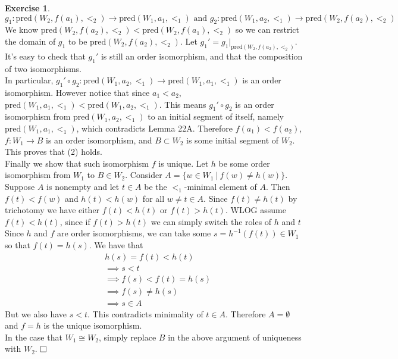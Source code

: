 \documentclass{article}
\theoremstyle{definition}
\newtheorem{exercise}{Exercise}[section]
\newcommand{\es}{$\hfill \square$}
\begin{document}
\begin{exercise}
        $$g_1: \text{pred}(W_2, f(a_1), <_2) \rightarrow \text{pred}(W_1, a_1, <_1) \text{ and } g_2: \text{pred}(W_1, a_2, <_1) \rightarrow \text{pred}(W_2, f(a_2), <_2)$$
        We know $\text{pred}(W_2, f(a_2), <_2)  < \text{pred}(W_2, f(a_1), <_2)$ so we can restrict the domain of $g_1$ to be $\text{pred}(W_2, f(a_2), <_2)$. Let $g_1' = g_1 |_{\text{pred}(W_2, f(a_2), <_2)}$. It's easy to check that $g_1'$ is still an order isomorphism, and that the composition of two isomorphisms.\\
        In particular, $g_1' \circ g_2: \text{pred}(W_1, a_2, <_1) \rightarrow \text{pred}(W_1, a_1, <_1)$ is an order isomorphism. However notice that since $a_1 < a_2$, $\text{pred}(W_1, a_1, <_1) < \text{pred}(W_1, a_2, <_1)$. This means $g_1' \circ g_2$ is an order isomorphism from $\text{pred}(W_1, a_2, <_1)$ to an initial segment of itself, namely $\text{pred}(W_1, a_1, <_1)$, which contradicts Lemma 22A. Therefore $f(a_1) < f(a_2)$, $f: W_1 \rightarrow B$ is an order isomorphism, and $B \subset W_2$ is some initial segment of $W_2$. This proves that (2) holds.\vspace{1em}\\
        Finally we show that such isomorphism $f$ is unique. Let $h$ be some order isomorphism from $W_1$ to $B \in W_2$. Consider $A = \{w \in W_1 \ |\ f(w) \neq h(w)\}$. Suppose $A$ is nonempty and let $t \in A$ be the $<_1$-minimal element of $A$. Then $f(t) < f(w)$ and $h(t) < h(w)$ for all $w \neq t \in A$. Since $f(t) \neq h(t)$ by trichotomy we have either $f(t) < h(t)$ or $f(t) > h(t)$. WLOG assume $f(t) < h(t)$, since if $f(t) > h(t)$ we can simply switch the roles of $h$ and $t$\\
        Since $h$ and $f$ are order isomorphisms, we can take some $s = h^{-1}(f(t)) \in W_1$ so that $f(t) = h(s)$. We have that 
        \begin{align*}
            &h(s) = f(t) < h(t) \\
            &\implies s < t \tag{$h$ is an order isomorphism}\\
            &\implies f(s) < f(t) = h(s) \tag{$f$ is an order isomorphism}\\
            &\implies f(s) \neq h(s)\\
            &\implies s \in A
        \end{align*}
        But we also have $s < t$. This contradicts minimality of $t \in A$. Therefore $A = \emptyset$ and $f = h$ is the unique isomorphism. \vspace{1em}\\
        In the case that $W_1 \cong W_2$, simply replace $B$ in the above argument of uniqueness with $W_2$. \es
    \end{exercise}
\end{document}

